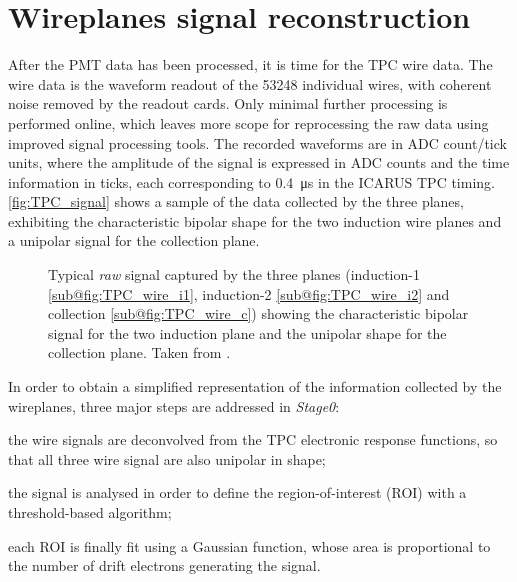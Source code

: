 \section{Wireplanes signal reconstruction}

After the PMT data has been processed, it is time for the TPC wire data. The wire data is the waveform readout of the \num{53248} individual wires, with coherent noise removed by the readout cards. Only minimal further processing is performed online, which leaves more scope for reprocessing the raw data using improved signal processing tools. The recorded waveforms are in ADC count/tick units, where the amplitude of the signal is expressed in ADC counts and the time information in ticks, each corresponding to \SI{0.4}{\us} in the ICARUS TPC timing. \autoref{fig:TPC_signal} shows a sample of the data collected by the three planes, exhibiting the characteristic bipolar shape for the two induction wire planes and a unipolar signal for the collection plane. 

\begin{figure}
    \centering
    \caption[TPC plane signal]{Typical \emph{raw} signal captured by the three planes (induction-1 \ref{sub@fig:TPC_wire_i1}, induction-2 \ref{sub@fig:TPC_wire_i2} and collection \ref{sub@fig:TPC_wire_c}) showing the characteristic bipolar signal for the two induction plane and the unipolar shape for the collection plane. Taken from \cite{ICARUS:2024hmk}. }
    \label{fig:TPC_signal}
\end{figure}

In order to obtain a simplified representation of the information collected by the wireplanes, three major steps are addressed in \emph{Stage0}: \begin{inparaenum}
    \item the wire signals are deconvolved from the TPC electronic response functions, so that all three wire signal are also unipolar in shape;
    \item the signal is analysed in order to define the region-of-interest (ROI) with a threshold-based algorithm; 
    \item each ROI is finally fit using a Gaussian function, whose area is proportional to the number of drift electrons generating the signal. 
\end{inparaenum}

